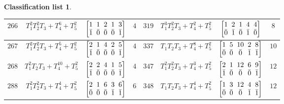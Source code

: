 \documentclass[pdftex]{sigma}%
\theoremstyle{definition}
\newtheorem{class-list}[thm]{Classification list}
\numberwithin{equation}{section}
\begin{document}
\begin{class-list}
\begin{table}[h!]
\begin{tabu}{c|c|c|c||c|c|c|c}
\\
\hline
${266}$&${T_{1}^{2}T_{2}^{2}T_{3}+T_{4}^{6}+T_{5}^{2}}$
&$\arraycolsep=1mm\begin{bmatrix}{1} & {1} & {2} & {1} & {3} \\ {\bar{1}} & {\bar{0}} & {\bar{0}} & {\bar{0}} & {\bar{1}}\end{bmatrix}$&${4}$
&${319}$&${T_{1}^{3}T_{2}^{2}T_{3}+T_{4}^{2}+T_{5}^{2}}$
&$\arraycolsep=1mm\begin{bmatrix}{1} & {2} & {1} & {4} & {4} \\ {\bar{0}} & {\bar{1}} & {\bar{0}} & {\bar{1}} & {\bar{0}}\end{bmatrix}$&${8}$
\\
\hline
${267}$&${T_{1}^{2}T_{2}^{2}T_{3}+T_{4}^{5}+T_{5}^{2}}$
&$\arraycolsep=1mm\begin{bmatrix}{2} & {1} & {4} & {2} & {5} \\ {\bar{1}} & {\bar{0}} & {\bar{0}} & {\bar{0}} & {\bar{1}}\end{bmatrix}$&${4}$
&${337}$&${T_{1}T_{2}T_{3}+T_{4}^{8}+T_{5}^{2}}$
&$\arraycolsep=1mm\begin{bmatrix}{1} & {5} & {10} & {2} & {8} \\ {\bar{0}} & {\bar{0}} & {\bar{0}} & {\bar{1}} & {\bar{1}}\end{bmatrix}$&${10}$
\\
\hline
${268}$&${T_{1}^{2}T_{2}T_{3}+T_{4}^{10}+T_{5}^{2}}$
&$\arraycolsep=1mm\begin{bmatrix}{2} & {2} & {4} & {1} & {5} \\ {\bar{1}} & {\bar{0}} & {\bar{0}} & {\bar{0}} & {\bar{1}}\end{bmatrix}$&${4}$
&${347}$&${T_{1}^{2}T_{2}^{2}T_{3}+T_{4}^{3}+T_{5}^{2}}$
&$\arraycolsep=1mm\begin{bmatrix}{2} & {1} & {12} & {6} & {9} \\ {\bar{1}} & {\bar{0}} & {\bar{0}} & {\bar{0}} & {\bar{1}}\end{bmatrix}$&${12}$
\\
\hline
${288}$&${T_{1}^{2}T_{2}^{2}T_{3}+T_{4}^{4}+T_{5}^{2}}$
&$\arraycolsep=1mm\begin{bmatrix}{2} & {1} & {6} & {3} & {6} \\ {\bar{0}} & {\bar{0}} & {\bar{0}} & {\bar{1}} & {\bar{1}}\end{bmatrix}$&${6}$
&${348}$&${T_{1}T_{2}T_{3}+T_{4}^{4}+T_{5}^{2}}$
&$\arraycolsep=1mm\begin{bmatrix}{1} & {3} & {12} & {4} & {8} \\ {\bar{0}} & {\bar{0}} & {\bar{0}} & {\bar{1}} & {\bar{1}}\end{bmatrix}$&${12}$

\end{tabu}
\end{table}
\end{class-list}
\end{document}
